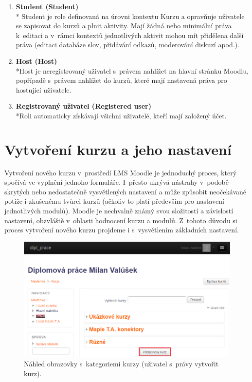 \documentclass[
print,
  11pt,
  table,   
  nolof,    
  nolot,
  oneside,
  draft
]{fithesis3}
\begin{document}
\begin{enumerate}
\item \textbf{Student (Student)} \\*
	Student je role definovaná na úrovni kontextu Kurzu a opravňuje uživatele se zapisovat do kurzů a plnit aktivity. Mají žádná nebo minimální práva k~editaci a v~rámci kontextů jednotlivých aktivit mohou mít přidělena další práva (editaci databáze slov, přidávání odkazů, moderování diskuzí apod.).

\item \textbf{Host (Host)} \\*Host je neregistrovaný uživatel s~právem nahlížet na hlavní stránku Moodlu, popřípadě s~právem nahlížet do kurzů, které mají nastavená práva pro hostující uživatele.

\item \textbf{Registrovaný uživatel (Registered user)} \\*Roli automaticky získávají všichni uživatelé, kteří mají založený účet.

\end{enumerate}


	\section{Vytvoření kurzu a jeho nastavení}
Vytvoření nového kurzu v~prostředí LMS Moodle je jednoduchý proces, kte\-rý spočívá ve vyplnění jednoho formuláře. I~přesto ukrývá nástrahy v~podobě skrytých nebo nedostatečně vysvětlených nastavení a může způsobit neočekávané potíže i zkušenému tvůrci kurzů (ačkoliv to platí především pro nastavení jednotlivých modulů). Moodle je nechvalně známý svou složitostí a závislostí nastavení, obzvláště v~oblasti hodnocení kurzu a modulů. Z~tohoto důvodu si proces vytvoření nového kurzu projdeme i s~vysvětlením základních nastavení.
		\begin{figure}
		  \begin{center}
		    \includegraphics[width=120mm]{images/kurzy-pridani.png}
		   \end{center}
		  \caption{Náhled obrazovky s~kategoriemi kurzy (uživatel s~právy vytvořit kurz).  }
		  \label{fig:moodlekurzypridani}
		\end{figure}
\end{document}
